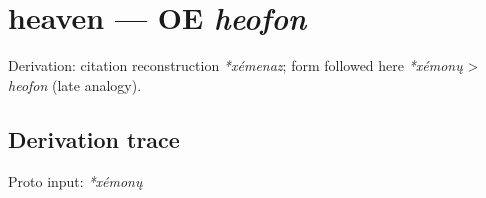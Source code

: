 \documentclass[
  british,
  a4paper,
  openany]{book}
\providecommand{\texorpdfstring}[2]{#1}
\begin{document}
\section{\texorpdfstring{heaven --- OE
\emph{heofon}}{heaven --- OE heofon}}\label{heaven-oe-heofon}


Derivation: citation reconstruction \emph{*xémenaz}; form followed here
\emph{*xémonų} \textgreater{} \emph{heofon} (late analogy).

\subsection{Derivation trace}\label{derivation-trace-116}

Proto input: \emph{*xémonų}

\begingroup
\setlength{\fboxsep}{6pt}
\end{document}

